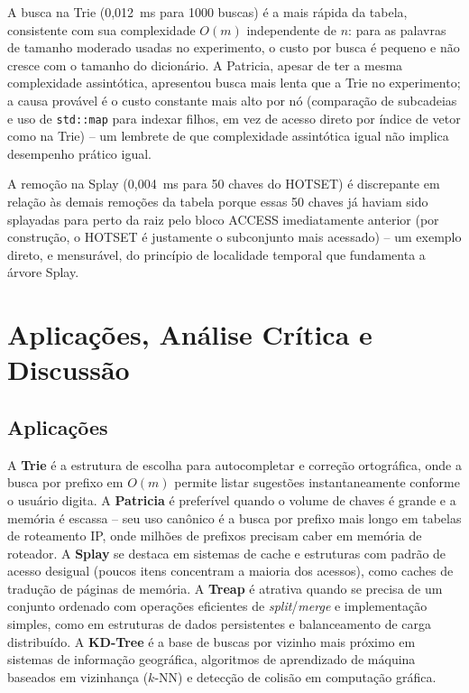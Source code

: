 \documentclass[conference]{IEEEtran}
\begin{document}
A busca na Trie (0,012~ms para 1000 buscas) é a mais rápida da tabela, consistente com sua complexidade $O(m)$ independente de $n$: para as palavras de tamanho moderado usadas no experimento, o custo por busca é pequeno e não cresce com o tamanho do dicionário. A Patricia, apesar de ter a mesma complexidade assintótica, apresentou busca mais lenta que a Trie no experimento; a causa provável é o custo constante mais alto por nó (comparação de subcadeias e uso de \texttt{std::map} para indexar filhos, em vez de acesso direto por índice de vetor como na Trie) -- um lembrete de que complexidade assintótica igual não implica desempenho prático igual.

A remoção na Splay (0,004~ms para 50 chaves do HOTSET) é discrepante em relação às demais remoções da tabela porque essas 50 chaves já haviam sido splayadas para perto da raiz pelo bloco ACCESS imediatamente anterior (por construção, o HOTSET é justamente o subconjunto mais acessado) -- um exemplo direto, e mensurável, do princípio de localidade temporal que fundamenta a árvore Splay.

\section{Aplicações, Análise Crítica e Discussão}

\subsection{Aplicações}
A \textbf{Trie} é a estrutura de escolha para autocompletar e correção ortográfica, onde a busca por prefixo em $O(m)$ permite listar sugestões instantaneamente conforme o usuário digita. A \textbf{Patricia} é preferível quando o volume de chaves é grande e a memória é escassa -- seu uso canônico é a busca por prefixo mais longo em tabelas de roteamento IP, onde milhões de prefixos precisam caber em memória de roteador. A \textbf{Splay} se destaca em sistemas de cache e estruturas com padrão de acesso desigual (poucos itens concentram a maioria dos acessos), como caches de tradução de páginas de memória. A \textbf{Treap} é atrativa quando se precisa de um conjunto ordenado com operações eficientes de \textit{split}/\textit{merge} e implementação simples, como em estruturas de dados persistentes e balanceamento de carga distribuído. A \textbf{KD-Tree} é a base de buscas por vizinho mais próximo em sistemas de informação geográfica, algoritmos de aprendizado de máquina baseados em vizinhança ($k$-NN) e detecção de colisão em computação gráfica.
\end{document}

